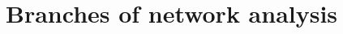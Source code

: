 \documentclass[8pt]{beamer}
\begin{document}





\section{Branches of network analysis}

\bgroup
{}
\begin{frame}[plain]{}
\begin{center}
\color{white}{\Huge\insertsection}
\end{center}
\end{frame}
\egroup

\end{document}
